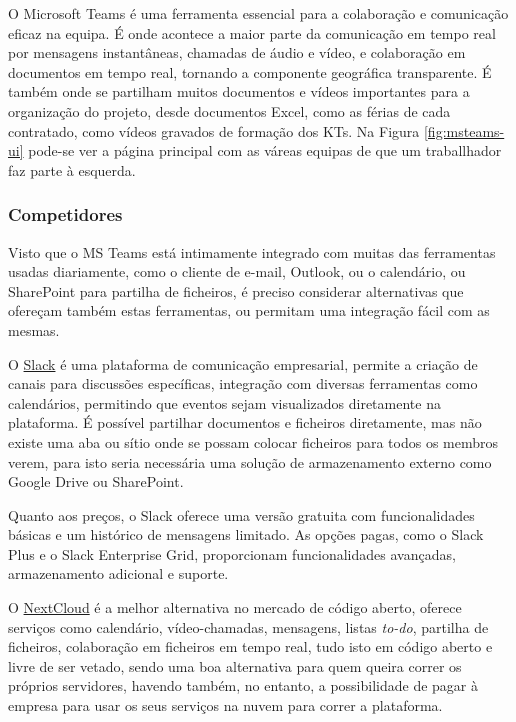         O Microsoft Teams é uma ferramenta essencial para a colaboração e comunicação eficaz na equipa. É onde acontece a maior parte da comunicação em tempo real por mensagens instantâneas, chamadas de áudio e vídeo, e colaboração em documentos em tempo real, tornando a componente geográfica transparente. É também onde se partilham muitos documentos e vídeos importantes para a organização do projeto, desde documentos Excel, como as férias de cada contratado, como vídeos gravados de formação dos KTs. Na Figura \ref{fig:msteams-ui} pode-se ver a página principal com as váreas equipas de que um traballhador faz parte à esquerda.
            
        \subsubsection{Competidores}\label{competidores-msteams}

        Visto que o MS Teams está intimamente integrado com muitas das ferramentas usadas diariamente, como o cliente de e-mail, Outlook, ou o calendário, ou SharePoint para partilha de ficheiros, é preciso considerar alternativas que ofereçam também estas ferramentas, ou permitam uma integração fácil com as mesmas.

            \label{competidores-slack}

                O \href{https://slack.com/}{Slack} é uma plataforma de comunicação empresarial, permite a criação de canais para discussões específicas, integração com diversas ferramentas como calendários, permitindo que eventos sejam visualizados diretamente na plataforma. É possível partilhar documentos e ficheiros diretamente, mas não existe uma aba ou sítio onde se possam colocar ficheiros para todos os membros verem, para isto seria necessária uma solução de armazenamento externo como Google Drive ou SharePoint.
                
                Quanto aos preços, o Slack oferece uma versão gratuita com funcionalidades básicas e um histórico de mensagens limitado. As opções pagas, como o Slack Plus e o Slack Enterprise Grid, proporcionam funcionalidades avançadas, armazenamento adicional e suporte.

            \label{competidores-nextcloud}

                O \href{https://nextcloud.com/}{NextCloud} é a melhor alternativa no mercado de código aberto, oferece serviços como calendário, vídeo-chamadas, mensagens, listas \textit{to-do}, partilha de ficheiros, colaboração em ficheiros em tempo real, tudo isto em código aberto e livre de ser vetado, sendo uma boa alternativa para quem queira correr os próprios servidores, havendo também, no entanto, a possibilidade de pagar à empresa para usar os seus serviços na nuvem para correr a plataforma.

